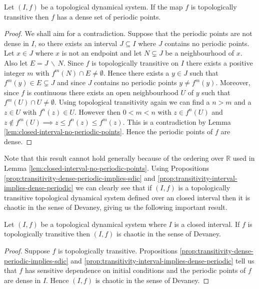\begin{prop} \label{prop:transitivity-interval-implies-dense-periodic}
    Let $(I, f)$ be a topological dynamical system. If the map $f$ is topologically transitive then $f$ has a dense set of periodic points.
    \begin{proof}
        We shall aim for a contradiction. Suppose that the periodic points are not dense in $I$, so there exists an interval $J \subseteq I$ where $J$ contains no periodic points. Let $x \in J$ where $x$ is not an endpoint and let $N \subsetneq J$ be a neighbourhood of $x$. Also let $E = J\, \backslash\, N$. Since $f$ is topologically transitive on $I$ there exists a positive integer $m$ with $f^m(N) \cap E \neq \emptyset$. Hence there exists a $y \in J$ such that $f^m(y) \in E \subsetneq J$ and since $J$ contains no periodic points $y \neq f^m(y)$. Moreover, since $f$ is continuous there exists an open neighbourhood $U$ of $y$ such that $f^m(U) \cap U \neq \emptyset$. Using topological transitivity again we can find a $n > m$ and a $z \in U$ with $f^n(z) \in U$. However then $0 < m < n$ with $z \in f^n(U)$ and $z \notin f^m(U) \implies z \leq f^n(z) \leq f^m(z)$. This is a contradiction by Lemma \ref{lem:closed-interval-no-periodic-points}. Hence the periodic points of $f$ are dense.
    \end{proof}
\end{prop}

Note that this result cannot hold generally because of the ordering over $\mathbb{R}$ used in Lemma \ref{lem:closed-interval-no-periodic-points}. Using Propositions \ref{prop:transitivity-dense-periodic-implies-sdic} and \ref{prop:transitivity-interval-implies-dense-periodic} we can clearly see that if $(I, f)$ is a topologically transitive topological dynamical system defined over an closed interval then it is chaotic in the sense of Devaney, giving us the following important result.

\begin{prop}\label{prop:chaotic-transitive}
    Let $(I, f)$ be a topological dynamical system where $I$ is a closed interval. If $f$ is topologically transitive then $(I, f)$ is chaotic in the sense of Devaney.
    \begin{proof}
        Suppose $f$ is topologically transitive. Propositions \ref{prop:transitivity-dense-periodic-implies-sdic} and \ref{prop:transitivity-interval-implies-dense-periodic} tell us that $f$ has sensitive dependence on initial conditions and the periodic points of $f$ are dense in $I$. Hence $(I, f)$ is chaotic in the sense of Devaney.
    \end{proof}
\end{prop}

